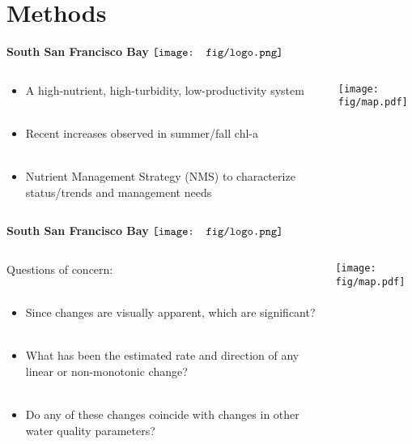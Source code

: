 \documentclass{beamer}
\begin{document}
\section{Methods}

\begin{frame}[t]{\textbf{South San Francisco Bay} \hspace{0pt plus 1 filll} $\vcenter{\hbox{\texttt{[image: fig/logo.png]}}}$}
\begin{columns}
\begin{column}{0.5\textwidth}
\begin{itemize}
\item A high-nutrient, high-turbidity, low-productivity system {\tiny \cite{Cole84,Alpine88}} \\~\\
\item Recent increases observed in summer/fall chl-a {\tiny \cite{Cloern07,Cloern12b}} \\~\\
\item Nutrient Management Strategy (NMS) to characterize status/trends and management needs 
\end{itemize}
\end{column}
\begin{column}{0.5\textwidth}
\centerline{\texttt{[image: fig/map.pdf]}}
\end{column}
\end{columns}
\end{frame}

\begin{frame}[t]{\textbf{South San Francisco Bay} \hspace{0pt plus 1 filll} $\vcenter{\hbox{\texttt{[image: fig/logo.png]}}}$}
\begin{columns}
\begin{column}{0.5\textwidth}
Questions of concern: \\~\\
\begin{itemize}
\item Since changes are visually apparent, which are significant?  \\~\\
\item What has been the estimated rate and direction of any linear or non-monotonic change? \\~\\
\item Do any of these changes coincide with changes in other water quality parameters?
\end{itemize}
\end{column}
\begin{column}{0.5\textwidth}
\centerline{\texttt{[image: fig/map.pdf]}}
\end{column}
\end{columns}
\end{frame}
\end{document}
